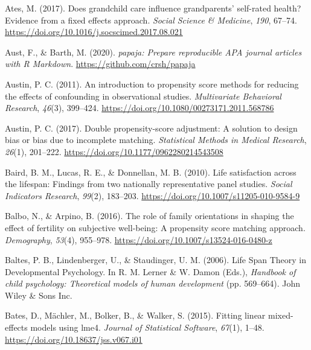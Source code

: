 \documentclass[
  english,
  man, noextraspace]{apa7}
\begin{document}
\leavevmode\hypertarget{ref-atesDoesGrandchildCare2017}{}%
Ates, M. (2017). Does grandchild care influence grandparents' self-rated health? Evidence from a fixed effects approach. \emph{Social Science \& Medicine}, \emph{190}, 67--74. \url{https://doi.org/10.1016/j.socscimed.2017.08.021}

\leavevmode\hypertarget{ref-R-papaja}{}%
Aust, F., \& Barth, M. (2020). \emph{papaja: Prepare reproducible APA journal articles with R Markdown}. \url{https://github.com/crsh/papaja}

\leavevmode\hypertarget{ref-austinIntroductionPropensityScore2011}{}%
Austin, P. C. (2011). An introduction to propensity score methods for reducing the effects of confounding in observational studies. \emph{Multivariate Behavioral Research}, \emph{46}(3), 399--424. \url{https://doi.org/10.1080/00273171.2011.568786}

\leavevmode\hypertarget{ref-austinDoublePropensityscoreAdjustment2017}{}%
Austin, P. C. (2017). Double propensity-score adjustment: A solution to design bias or bias due to incomplete matching. \emph{Statistical Methods in Medical Research}, \emph{26}(1), 201--222. \url{https://doi.org/10.1177/0962280214543508}

\leavevmode\hypertarget{ref-bairdLifeSatisfactionLifespan2010}{}%
Baird, B. M., Lucas, R. E., \& Donnellan, M. B. (2010). Life satisfaction across the lifespan: Findings from two nationally representative panel studies. \emph{Social Indicators Research}, \emph{99}(2), 183--203. \url{https://doi.org/10.1007/s11205-010-9584-9}

\leavevmode\hypertarget{ref-balboRoleFamilyOrientations2016}{}%
Balbo, N., \& Arpino, B. (2016). The role of family orientations in shaping the effect of fertility on subjective well-being: A propensity score matching approach. \emph{Demography}, \emph{53}(4), 955--978. \url{https://doi.org/10.1007/s13524-016-0480-z}

\leavevmode\hypertarget{ref-baltesLifeSpanTheory2006}{}%
Baltes, P. B., Lindenberger, U., \& Staudinger, U. M. (2006). Life Span Theory in Developmental Psychology. In R. M. Lerner \& W. Damon (Eds.), \emph{Handbook of child psychology: Theoretical models of human development} (pp. 569--664). John Wiley \& Sons Inc.

\leavevmode\hypertarget{ref-R-lme4}{}%
Bates, D., Mächler, M., Bolker, B., \& Walker, S. (2015). Fitting linear mixed-effects models using lme4. \emph{Journal of Statistical Software}, \emph{67}(1), 1--48. \url{https://doi.org/10.18637/jss.v067.i01}
\end{document}

